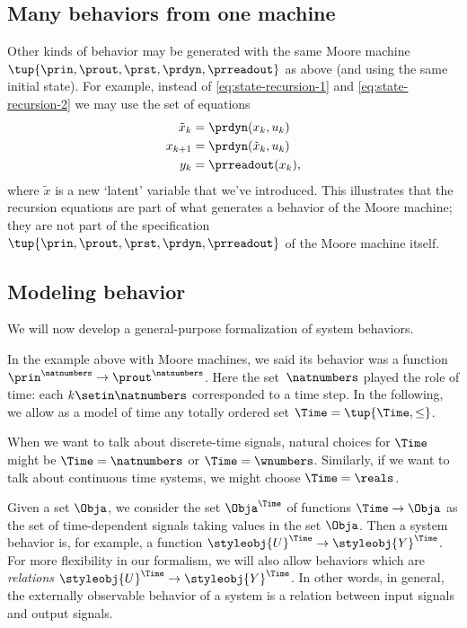 \subsection{Many behaviors from one machine}

Other kinds of behavior may be generated with the same Moore machine $\tup{\prin, \prout, \prst, \prdyn, \prreadout}$ as above (and using the same initial state).
For example, instead of \cref{eq:state-recursion-1} and \cref{eq:state-recursion-2} we may use the set of equations
\begin{align}
    \tilde x_{k} & = \prdyn(x_k, u_k) \\
    x_{k+1}      & = \prdyn(\tilde x_{k}, u_k) \\
    y_{k}        & = \prreadout(x_{k}),
\end{align}
where $\tilde x$ is a new `latent' variable that we've introduced.
This illustrates that the recursion equations are part of what generates a behavior of the Moore machine; they are not part of the specification $\tup{\prin, \prout, \prst, \prdyn, \prreadout}$ of the Moore machine itself.

\subsection{Modeling behavior}

We will now develop a general-purpose formalization of system behaviors.

In the example above with Moore machines, we said its behavior was a function $\prin^\natnumbers \to \prout^\natnumbers$.
Here the set~$\natnumbers$ played the role of time: each $k \setin \natnumbers$ corresponded to a time step.
In the following, we allow as a model of time any totally ordered set $\Time = \tup{\Time, \leq}$.

When we want to talk about discrete-time signals, natural choices for $\Time$ might be $\Time = \natnumbers$ or $\Time = \wnumbers$.
Similarly, if we want to talk about continuous time systems, we might choose $\Time = \reals$.

Given a set $\Obja$, we consider the set $\Obja^\Time$ of functions $\Time \to \Obja$ as the set of time-dependent signals taking values in the set $\Obja$.
Then a system behavior is, for example, a function $\styleobj{U}^\Time \to \styleobj{Y}^\Time$.
For more flexibility in our formalism, we will also allow behaviors which are \emph{relations} $\styleobj{U}^\Time \to \styleobj{Y}^\Time$.
In other words, in general, the externally observable behavior of a system is a relation between input signals and output signals.

